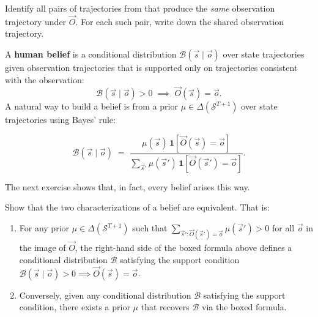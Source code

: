 \documentclass[11pt]{article}
\newcommand{\cS}{\mathcal{S}}
\newcommand{\cB}{\mathcal{B}}
\begin{document}

\begin{exercise}
\label{prob:obsclasses}
Identify all pairs of trajectories from
 that produce the \emph{same} observation trajectory under
$\vec O$. For each such pair, write down the shared observation trajectory.
\end{exercise}



\begin{definition}\label{def:belief}
A \textbf{human belief} is a conditional distribution
$\cB(\vec s \mid \vec o)$ over state trajectories given observation
trajectories that is supported only on trajectories consistent with the
observation:
$$
\cB(\vec s \mid \vec o) > 0 \;\implies\; \vec O(\vec s) = \vec o.
$$
A natural way to build a belief is from a prior $\mu \in \Delta(\cS^{T+1})$
over state trajectories using Bayes' rule:
\begin{callout}
$$
\cB(\vec s \mid \vec o) \;=\; \frac{\mu(\vec s)\,\mathbf{1}[\vec O(\vec s) = \vec o]}
{\sum_{\vec s'} \mu(\vec s')\,\mathbf{1}[\vec O(\vec s') = \vec o]}.
$$
\end{callout}
The next exercise shows that, in fact, every belief arises this way.
\end{definition}


\begin{exercise}
\label{prob:belief_equiv}
Show that the two characterizations
of a belief are equivalent. That is:
\begin{enumerate}
    \item For any prior $\mu \in \Delta(\cS^{T+1})$ such that
        $\sum_{\vec s' : \vec O(\vec s') = \vec o} \mu(\vec s') > 0$ for
        all $\vec o$ in the image of $\vec O$, the right-hand side of the
        boxed formula above defines a conditional distribution $\cB$
        satisfying the support condition
        $\cB(\vec s \mid \vec o) > 0 \implies \vec O(\vec s) = \vec o$.
    \item Conversely, given any conditional distribution $\cB$ satisfying
        the support condition, there exists a prior $\mu$ that recovers
        $\cB$ via the boxed formula.
\end{enumerate}
\end{exercise}
\end{document}
